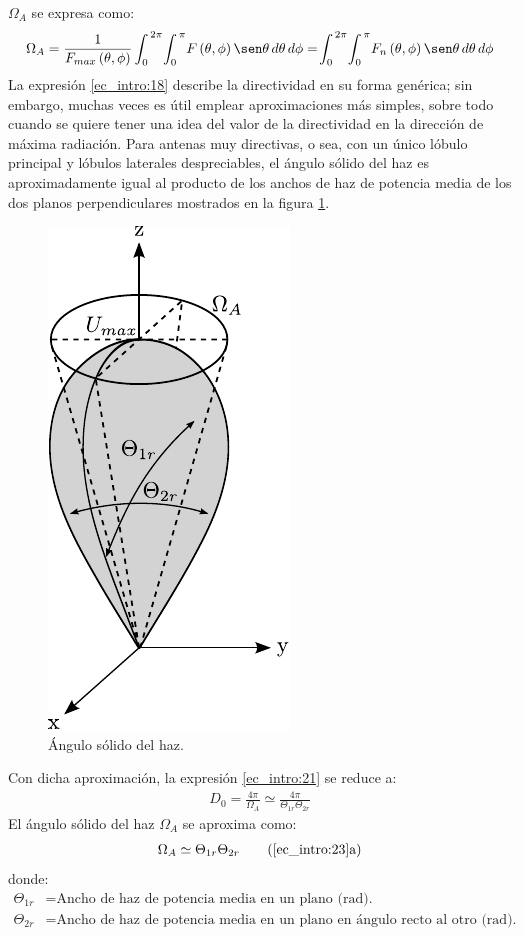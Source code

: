 $\Omega_A$ se expresa como:
\begin{gather}
\Omega_A = \frac{1}{F_{max}\left(\theta,\phi\right)}\int_0^{\,2\pi}\!\int_0^{\,\pi}\!F\left(\theta,\phi\right)\sen\theta\,d\theta\,d\phi = \!\int_0^{\,2\pi}\!\int_0^{\,\pi}\!F_n\left(\theta,\phi\right)\sen\theta\,d\theta\,d\phi
\label{ec_intro:22}
\end{gather}
La expresión \eqref{ec_intro:18} describe la directividad en su forma genérica; sin embargo, muchas veces es útil emplear aproximaciones más simples, sobre todo cuando se quiere tener una idea del valor de la directividad en la dirección de máxima radiación. Para antenas muy directivas, o sea, con un único lóbulo principal y lóbulos laterales despreciables, el ángulo sólido del haz es aproximadamente igual al producto de los anchos de haz de potencia media de los dos planos perpendiculares mostrados en la figura \ref{fig_intro:4}.
\begin{figure} [H]
\centering 
\includegraphics[scale = 1]{Figures/Intro/intro_4.pdf}
\caption{Ángulo sólido del haz.}
\label{fig_intro:4}
\end{figure}
Con dicha aproximación, la expresión \eqref{ec_intro:21} se reduce a:
\begin{align}
D_0 = \frac{4\pi}{\Omega_A} \simeq \frac{4\pi}{\Theta_{1r}\Theta_{2r}}
\label{ec_intro:23}
\end{align}
El ángulo sólido del haz $\Omega_A$ se aproxima como:
\begin{align}
\Omega_A \simeq \Theta_{1r}\Theta_{2r}
\tag{\ref{ec_intro:23}a}
\label{ec_intro:24}
\end{align}
donde:
\begin{align*}
\Theta_{1r} &= \text{Ancho de haz de potencia media en un plano (rad).}\\
\Theta_{2r} &= \text{Ancho de haz de potencia media en un plano en ángulo recto al otro (rad).}
\end{align*}

